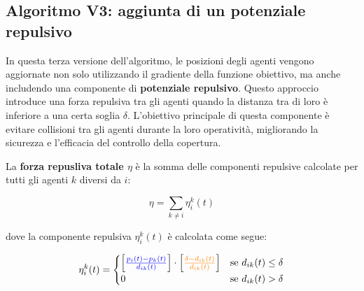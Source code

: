\documentclass[twoside]{article}
\begin{document}
\subsection{Algoritmo V3: aggiunta di un potenziale repulsivo}\label{section: v3}

In questa terza versione dell'algoritmo, le posizioni degli agenti vengono aggiornate non solo utilizzando il gradiente della funzione obiettivo, ma anche includendo una componente di \textbf{potenziale repulsivo}. Questo approccio introduce una forza repulsiva tra gli agenti quando la distanza tra di loro è inferiore a una certa soglia \(\delta\). L'obiettivo principale di questa componente è evitare collisioni tra gli agenti durante la loro operatività, migliorando la sicurezza e l'efficacia del controllo della copertura.

\vspace{\baselineskip}
\begin{algorithm}[H]
\SetAlgoLined
{}
\caption{V3: Algoritmo di coverage dinamico, aggiunta di un potenziale repulsivo}
\end{algorithm}

\vspace{\baselineskip}

La \textbf{forza repusliva totale \(\eta\)} è la somma delle componenti repulsive calcolate per tutti gli agenti \(k\) diversi da \(i\):

\begin{equation}
\eta = \sum_{k \ne i} \eta^k_i(t)
\end{equation}

dove la componente repulsiva \(\eta^k_i(t)\) è calcolata come segue:

\begin{equation}
\eta^k_i(t) = 
\begin{cases} 
\left[ \textcolor{blue}{\frac{p_i(t) - p_k(t)}{d_{ik}(t)}} \right] \cdot \left[ \textcolor{orange}{\frac{\delta - d_{ik}(t)}{d_{ik}(t)}} \right] & \text{se } d_{ik}(t) \leq \delta \\
0 & \text{se } d_{ik}(t) > \delta 
\end{cases}
\label{eq:potenziale_repulsivo}
\end{equation}
\end{document}
